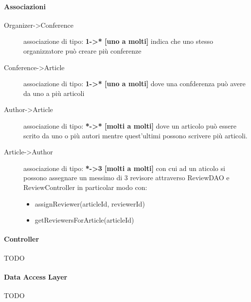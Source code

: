 \paragraph{Associazioni}
\begin{description}
\item [Organizer->Conference] associazione di tipo: \textbf{1->* [uno a molti]} indica che uno stesso organizzatore può creare più conferenze
\item [Conference->Article] associazione di tipo: \textbf{1->* [uno a molti]} dove una confderenza può avere da uno a più articoli
\item [Author->Article] associazione di tipo: \textbf{*->* [molti a molti]} dove un articolo può essere scrito da uno o più autori mentre quest'ultimi possono scrivere più articoli.
\item [Article->Author] associazione di tipo: \textbf{*->3 [molti a molti]} con cui ad un aticolo si possono assegnare un messimo di 3 revisore attraverso ReviewDAO e ReviewController in particolar modo con:
\begin{itemize}
 \item assignReviewer(articleId, reviewerId)
\item getReviewersForArticle(articleId)
\end{itemize}
\end{description}

\paragraph{Controller}
\begin{description}
\item[TODO]
\end{description}

\paragraph{Data Access Layer}
\begin{description}
\item[TODO]
\end{description}

